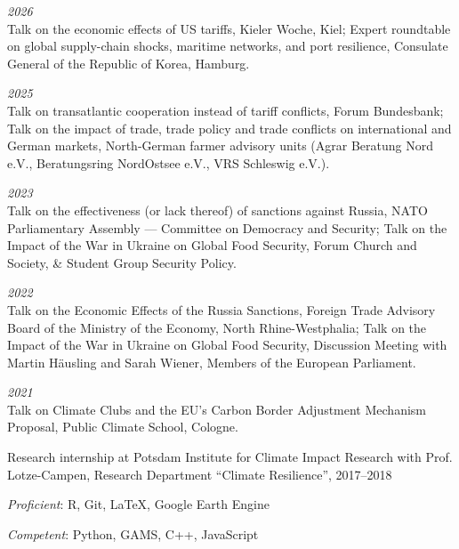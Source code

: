 \documentclass{article}
\newlength{\cvlabelwidth}\setlength{\cvlabelwidth}{0.12\textwidth}
\newlength{\cvlabelgap}\setlength{\cvlabelgap}{5mm}
\newcommand{\cvmakelabel}[1]{%
    \smash{\parbox[t]{\cvlabelwidth}{\raggedright{\fontfamily{phv}\selectfont #1}}}}
\newenvironment{cvsection}[1]{%
    \par\medskip
    \begin{list}{}{%
        \setlength{\leftmargin}{\dimexpr\cvlabelwidth+\cvlabelgap\relax}%
        \setlength{\labelwidth}{\cvlabelwidth}%
        \setlength{\labelsep}{\cvlabelgap}%
        \setlength{\rightmargin}{0pt}%
        \setlength{\itemindent}{0pt}%
        \setlength{\listparindent}{0pt}%
        \setlength{\topsep}{0pt}%
        \setlength{\partopsep}{0pt}%
        \setlength{\parsep}{0.3em}%
        \setlength{\itemsep}{0pt}%
        \let\makelabel\cvmakelabel%
    }%
    \item[#1]\ignorespaces%
}{%
    \end{list}\medskip%
}
\begin{document}
\begin{cvsection}{NON-ACADEMIC TALKS}
  \textit{2026} \\
    Talk on the economic effects of US tariffs, Kieler Woche, Kiel; Expert roundtable on global supply-chain shocks, maritime networks, and port resilience, Consulate General of the Republic of Korea, Hamburg. \par
  \textit{2025} \\
    Talk on transatlantic cooperation instead of tariff conflicts, Forum Bundesbank;
    Talk on the impact of trade, trade policy and trade conflicts on international and German markets, North-German farmer advisory units (Agrar Beratung Nord e.V., Beratungsring NordOstsee e.V., VRS Schleswig e.V.). \par 
    \textit{2023} \\
    Talk on the effectiveness (or lack thereof) of sanctions against Russia, NATO Parliamentary Assembly --- Committee on Democracy and Security; Talk on the Impact of the War in Ukraine on Global Food Security, Forum Church and Society, \& Student Group Security Policy. \par 
    \textit{2022} \\
    Talk on the Economic Effects of the Russia Sanctions, Foreign Trade Advisory Board of the Ministry of the Economy, North Rhine-Westphalia; Talk on the Impact of the War in Ukraine on Global Food Security, Discussion Meeting with Martin Häusling and Sarah Wiener, Members of the European Parliament. \par
    \textit{2021} \\
    Talk on Climate Clubs and the EU's Carbon Border Adjustment Mechanism Proposal, Public Climate School, Cologne. \par
\end{cvsection}


\begin{cvsection}{WORK EXPERIENCE}
    Research internship at Potsdam Institute for Climate Impact Research with Prof. Lotze-Campen, Research Department ``Climate Resilience'', 2017--2018
\end{cvsection}


\begin{cvsection}{PROGRAMMING}
    \textit{Proficient}: R, Git, LaTeX, Google Earth Engine \par
    \textit{Competent}: Python, GAMS, C++, JavaScript
\end{cvsection}
\end{document}
